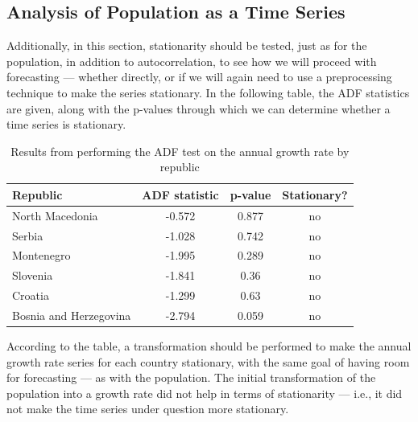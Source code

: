 \documentclass[a4paper,11pt]{article}
\begin{document}
\subsection{Analysis of Population as a Time Series}
Additionally, in this section, stationarity should be tested, just as for the population, in addition to autocorrelation, to see how we will proceed with forecasting — whether directly, or if we will again need to use a preprocessing technique to make the series stationary. In the following table, the ADF statistics are given, along with the p-values through which we can determine whether a time series is stationary.
\begin{table}[H]
\centering
\begin{tabular}{|l|c|c|c|}
\hline
\textbf{Republic} & \textbf{ADF statistic} & \textbf{p-value} & \textbf{Stationary?} \\
\hline
North Macedonia & -0.572 & 0.877 & no \\
Serbia & -1.028 & 0.742 & no \\
Montenegro & -1.995 & 0.289 & no \\
Slovenia & -1.841 & 0.36 &  no \\
Croatia & -1.299 & 0.63 & no \\
Bosnia and Herzegovina & -2.794 & 0.059 & no \\
\hline
\end{tabular}
\caption{Results from performing the ADF test on the annual growth rate by republic}
\label{tab:adf-test-results-growth-rate}
\end{table}
According to the table, a transformation should be performed to make the annual growth rate series for each country stationary, with the same goal of having room for forecasting — as with the population. The initial transformation of the population into a growth rate did not help in terms of stationarity — i.e., it did not make the time series under question more stationary.
\end{document}
